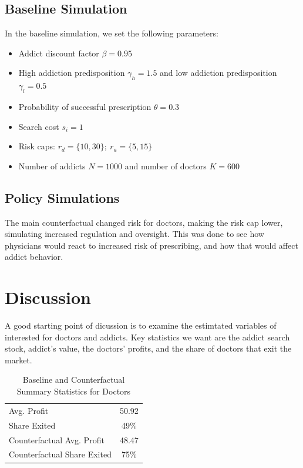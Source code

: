 \documentclass[11pt,a4paper]{article}
\begin{document}
\subsection{Baseline Simulation}
\label{subsec:baseline_simulation}
In the baseline simulation, we set the following parameters:
\begin{itemize}
  \item Addict discount factor $\beta = 0.95$
  \item High addiction predisposition $\gamma_h = 1.5$ and low addiction predisposition $\gamma_l = 0.5$
  \item Probability of successful prescription $\theta = 0.3$
  \item Search cost $s_i = 1$
  \item Risk caps: $r_d = \{10, 30\}; \ r_a = \{5, 15\}$
  \item Number of addicts $N = 1000$ and number of doctors $K = 600$
\end{itemize}
\subsection{Policy Simulations}
\label{subsec:policy_simulations}
The main counterfactual changed risk for doctors, making the risk cap lower, simulating increased regulation and oversight. This was done to see how physicians would react to increased risk of prescribing, and how that would affect addict behavior.
\section{Discussion}
\label{sec:discussion}

A good starting point of dicussion is to examine the estimtated variables of interested for doctors and addicts. Key statistics we want are the addict search stock, addict's value, the doctors' profits, and the share of doctors that exit the market. 

\begin{table}[htbp]
  \centering
  \caption{Baseline and Counterfactual Summary Statistics for Doctors}
  \begin{tabular}{|l|c|}
  \hline
    Avg. Profit & 50.92 \\
    Share Exited & 49\% \\
    Counterfactual Avg. Profit & 48.47 \\
    Counterfactual Share Exited & 75\% \\
  \hline
  \end{tabular}
  \label{tab:baseline_counterfactual_stats}
\end{table}
\end{document}
